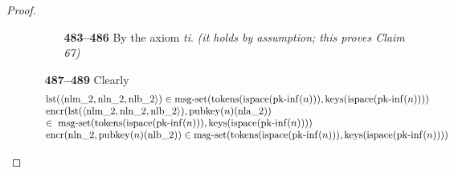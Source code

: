 \documentclass[11pt]{article}
\theoremstyle{plain}
\begin{document}
\begin{proof}
\begin{itemize}[leftmargin=2.8em, itemsep=4pt, parsep=1pt]
\begin{itemize}[leftmargin=2.8em, itemsep=4pt, parsep=1pt]
  \begin{itemize}[leftmargin=2.8em, itemsep=4pt, parsep=1pt]
  \item[\textbf{483--486}] By the axiom \emph{ti}.  \emph{(it holds by assumption; this proves Claim 67)}
  \end{itemize}
  \item[\textbf{487--489}] Clearly
\begin{equation*}
\begin{array}{@{}l@{}}
\operatorname{lst}(\langle \operatorname{nlm\_2}, \operatorname{nln\_2}, \operatorname{nlb\_2} \rangle) \in \operatorname{msg\text{-}set}(\operatorname{tokens}(\operatorname{ispace}(\operatorname{pk\text{-}inf}(n))), \operatorname{keys}(\operatorname{ispace}(\operatorname{pk\text{-}inf}(n)))) \\
\begin{array}{@{}l@{}} \operatorname{encr}(\operatorname{lst}(\langle \operatorname{nlm\_2}, \operatorname{nln\_2}, \operatorname{nlb\_2} \rangle), \operatorname{pubkey}(n)(\operatorname{nla\_2})) \\ \in\; \operatorname{msg\text{-}set}(\operatorname{tokens}(\operatorname{ispace}(\operatorname{pk\text{-}inf}(n))), \operatorname{keys}(\operatorname{ispace}(\operatorname{pk\text{-}inf}(n)))) \end{array} \\
\operatorname{encr}(\operatorname{nln\_2}, \operatorname{pubkey}(n)(\operatorname{nlb\_2})) \in \operatorname{msg\text{-}set}(\operatorname{tokens}(\operatorname{ispace}(\operatorname{pk\text{-}inf}(n))), \operatorname{keys}(\operatorname{ispace}(\operatorname{pk\text{-}inf}(n))))
\end{array}
\end{equation*}


\end{itemize}
\end{itemize}
\end{proof}
\end{document}

